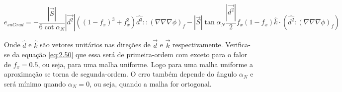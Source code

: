 \begin{equation}
    e_{snGrad} = -\frac{|\vec{S}|}{6 \cot{\alpha_N}} |\vec{d^2}| ((1-f_x)^3 + f_x^3)\hat{d^3}:: (\nabla \nabla \nabla \phi)_f - |\vec{S}| \tan{\alpha_N} \frac{|\vec{d^2}|}{2}f_x(1-f_x)\hat{k} \cdot (\hat{d^2}:(\nabla \nabla \nabla \phi)_f)
    \label{eq:2.50}
\end{equation}

Onde $\hat{d}$ e $\hat{k}$ são vetores unitários nas direções de $\vec{d}$ e $\vec{k}$ respectivamente. Verifica-se da equação \ref{eq:2.50} que essa será de primeira-ordem com exceto para o falor de $f_x=0.5$, ou seja, para uma malha uniforme. Logo para uma malha uniforme a aproximação se torna de segunda-ordem. O erro também depende do ângulo $\alpha_N$ e será mínimo quando $\alpha_N=0$, ou seja, quando a malha for ortogonal.